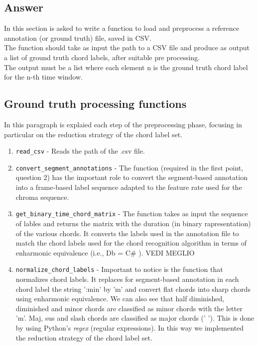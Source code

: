\documentclass[
	12pt, %
]{fphw}
\begin{document}
\subsection*{\color{blue}Answer}

In this section is asked to write a function to load and preprocess a reference annotation (or ground truth) file, saved in CSV. \\
The function should take as input the path to a CSV file and produce as output a list of ground truth chord labels, after suitable pre processing.\\
The output must be a list where each element
n is the ground truth chord label for the n-th time window.

\subsection*{Ground truth processing functions}

In this paragraph is explaied each step of the preprocessing phase, focusing in particular on the reduction strategy of the chord label set.

\begin{enumerate}
	\item \verb|read_csv| - Reads the path of the .csv file.
	\item \verb|convert_segment_annotations| - The function (required in the first point, question 2) has the important role to convert the segment-based annotation into a frame-based label sequence adapted to the feature rate used for the chroma sequence.
	\item \verb|get_binary_time_chord_matrix| - The function takes as input the sequence of lables and returns the matrix with the duration (in binary rapresentation) of the various chords. It converts the labels used in the annotation file to match the chord labels used for the chord recognition
algorithm in terms of enharmonic equivalence (i.e., Db = C\# ).
\color{red} VEDI MEGLIO \color{black}
	\item \verb|normalize_chord_labels| - Important to notice is the function that normalizes chord labels. It replaces for segment-based annotation in each chord label the string ':min' by 'm' and convert flat chords into sharp chords using enharmonic equivalence. We can also see that half diminished, diminished and minor chords are classified as minor chords with the letter 'm'. Maj, sus and slash  chords are classified as major chords (' '). This is done by using Python's \textit{regex} (regular expressions). In this way we implemented the reduction strategy of the chord label set.
\end{enumerate}
\end{document}
